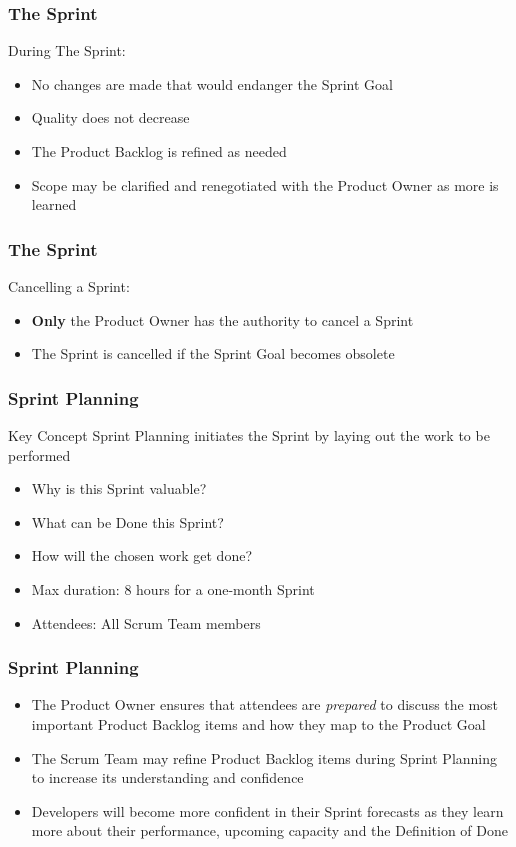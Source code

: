 \begin{frame}
	\frametitle{The Sprint}
	During The Sprint:
	\vspace{1em}
	\begin{itemize}
		\setlength\itemsep{0.7em}
		\item No changes are made that would endanger the Sprint Goal
		\item Quality does not decrease
		\item The Product Backlog is refined as needed
		\item Scope may be clarified and renegotiated with the Product Owner as more is learned
	\end{itemize}
\end{frame}

\begin{frame}
	\frametitle{The Sprint}
	Cancelling a Sprint:
	\begin{itemize}
		\setlength\itemsep{0.7em}
		\item \textbf{Only} the Product Owner has the authority to cancel a Sprint
		\item The Sprint is cancelled if the Sprint Goal becomes obsolete
	\end{itemize}
\end{frame}

\begin{frame}
	\frametitle{Sprint Planning}
	\begin{block}{Key Concept}
		Sprint Planning initiates the Sprint by laying out the work to be performed
	\end{block}
	\vspace{0.5em}
	\begin{itemize}
		\setlength\itemsep{0.7em}
		\item Why is this Sprint valuable?
	  \item What can be Done this Sprint?
	  \item How will the chosen work get done?
		\item Max duration: 8 hours for a one-month Sprint
		\item Attendees: All Scrum Team members
	\end{itemize}
\end{frame}

\begin{frame}
	\frametitle{Sprint Planning}
	\begin{itemize}
		\setlength\itemsep{0.7em}
		\item The Product Owner ensures that attendees are \textit{prepared} to discuss the most important Product Backlog items and how they map to the Product Goal
		\item The Scrum Team may refine Product Backlog items during Sprint Planning to increase its understanding and confidence
		\item Developers will become more confident in their Sprint forecasts as they learn more about their performance, upcoming capacity and the Definition of Done
	\end{itemize}
\end{frame}


